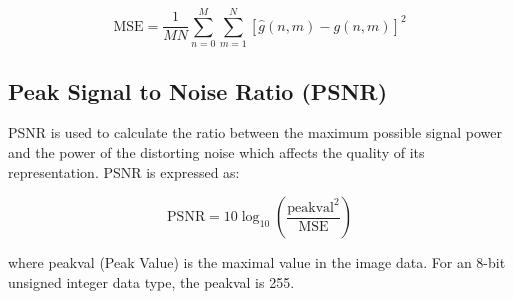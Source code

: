 \begin{equation}
\text{MSE} = \frac{1}{MN} \sum_{n=0}^{M} \sum_{m=1}^{N} [\hat{g}(n,m) - g(n,m)]^2
\end{equation}

\subsection{Peak Signal to Noise Ratio (PSNR)}

PSNR is used to calculate the ratio between the maximum possible signal power and the power of the distorting noise which affects the quality of its representation. PSNR is expressed as:

\begin{equation}
\text{PSNR} = 10\log_{10}\left(\frac{\text{peakval}^2}{\text{MSE}}\right)
\end{equation}

where peakval (Peak Value) is the maximal value in the image data. For an 8-bit unsigned integer data type, the peakval is 255.

